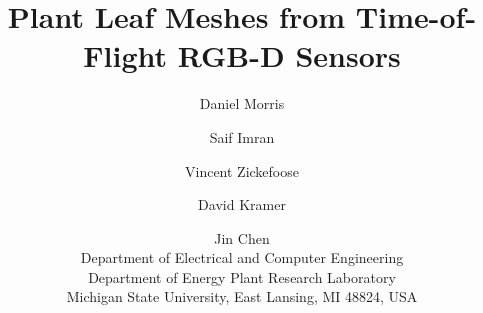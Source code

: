 \documentclass[10pt,twocolumn,letterpaper]{article}
\begin{document}
\title{Plant Leaf Meshes from Time-of-Flight RGB-D Sensors}

\author{
Daniel Morris \and Saif Imran \and Vincent Zickefoose \and David Kramer \and Jin Chen\\
Department of Electrical and Computer Engineering\\
Department of Energy Plant Research Laboratory\\
Michigan State University, East Lansing, MI 48824, USA
}

\maketitle

\begin{abstract}

\end{abstract}


















{\small


}
\end{document}
